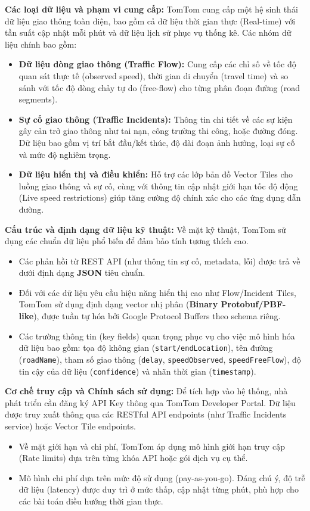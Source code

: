 
\textbf{Các loại dữ liệu và phạm vi cung cấp:} TomTom cung cấp một hệ sinh thái dữ liệu giao thông toàn diện, bao gồm cả dữ liệu thời gian thực (Real-time) với tần suất cập nhật mỗi phút và dữ liệu lịch sử phục vụ thống kê. Các nhóm dữ liệu chính bao gồm:
\begin{itemize}
    \item \textbf{Dữ liệu dòng giao thông (Traffic Flow):} Cung cấp các chỉ số về tốc độ quan sát thực tế (observed speed), thời gian di chuyển (travel time) và so sánh với tốc độ dòng chảy tự do (free-flow) cho từng phân đoạn đường (road segments).
    \item \textbf{Sự cố giao thông (Traffic Incidents):} Thông tin chi tiết về các sự kiện gây cản trở giao thông như tai nạn, công trường thi công, hoặc đường đóng. Dữ liệu bao gồm vị trí bắt đầu/kết thúc, độ dài đoạn ảnh hưởng, loại sự cố và mức độ nghiêm trọng.
    \item \textbf{Dữ liệu hiển thị và điều khiển:} Hỗ trợ các lớp bản đồ Vector Tiles cho luồng giao thông và sự cố, cùng với thông tin cập nhật giới hạn tốc độ động (Live speed restrictions) giúp tăng cường độ chính xác cho các ứng dụng dẫn đường.
\end{itemize}

\textbf{Cấu trúc và định dạng dữ liệu kỹ thuật:} Về mặt kỹ thuật, TomTom sử dụng các chuẩn dữ liệu phổ biến để đảm bảo tính tương thích cao.
\begin{itemize}
    \item Các phản hồi từ REST API (như thông tin sự cố, metadata, lỗi) được trả về dưới định dạng \textbf{JSON} tiêu chuẩn.
    \item Đối với các dữ liệu yêu cầu hiệu năng hiển thị cao như Flow/Incident Tiles, TomTom sử dụng định dạng vector nhị phân (\textbf{Binary Protobuf/PBF-like}), được tuần tự hóa bởi Google Protocol Buffers theo schema riêng.
    \item Các trường thông tin (key fields) quan trọng phục vụ cho việc mô hình hóa dữ liệu bao gồm: tọa độ không gian (\texttt{start/endLocation}), tên đường (\texttt{roadName}), tham số giao thông (\texttt{delay}, \texttt{speedObserved}, \texttt{speedFreeFlow}), độ tin cậy của dữ liệu (\texttt{confidence}) và nhãn thời gian (\texttt{timestamp}).
\end{itemize}

\textbf{Cơ chế truy cập và Chính sách sử dụng:} Để tích hợp vào hệ thống, nhà phát triển cần đăng ký API Key thông qua TomTom Developer Portal. Dữ liệu được truy xuất thông qua các RESTful API endpoints (như Traffic Incidents service) hoặc Vector Tile endpoints.
\begin{itemize}
    \item Về mặt giới hạn và chi phí, TomTom áp dụng mô hình giới hạn truy cập (Rate limits) dựa trên từng khóa API hoặc gói dịch vụ cụ thể.
    \item Mô hình chi phí dựa trên mức độ sử dụng (pay-as-you-go). Đáng chú ý, độ trễ dữ liệu (latency) được duy trì ở mức thấp, cập nhật từng phút, phù hợp cho các bài toán điều hướng thời gian thực.
\end{itemize}

